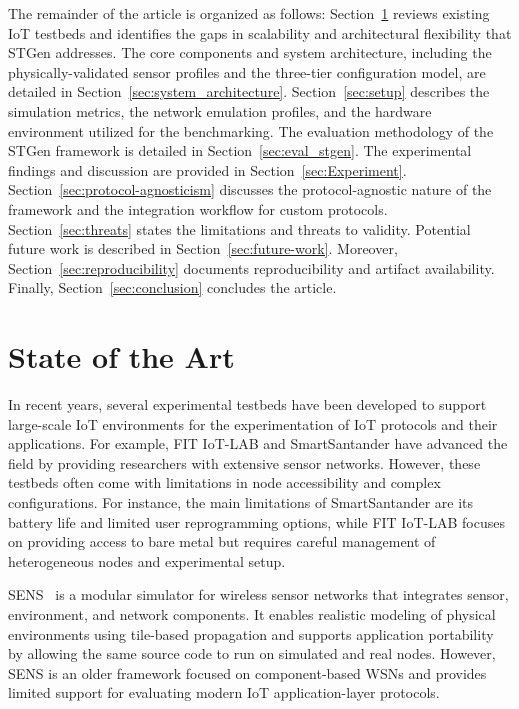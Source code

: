 \documentclass[jsan,article,submit,moreauthors,pdftex]{Definitions/mdpi}
\begin{document}
The remainder of the article is organized as follows: Section~\ref{sec:related_work} reviews existing {IoT} testbeds and identifies the gaps in scalability and architectural flexibility that STGen addresses. The core components and system architecture, including the physically-validated sensor profiles and the three-tier configuration model, are detailed in Section~\ref{sec:system_architecture}. Section~\ref{sec:setup} describes the simulation metrics, the network emulation profiles, and the hardware environment utilized for the benchmarking.  The evaluation methodology of the STGen framework is detailed in Section~\ref{sec:eval_stgen}. The experimental findings and discussion are provided in Section~\ref{sec:Experiment}. Section~\ref{sec:protocol-agnosticism} discusses the protocol-agnostic nature of the framework and the integration workflow for custom protocols. Section~\ref{sec:threats} states the limitations and threats to validity. Potential future work is described in Section~\ref{sec:future-work}. Moreover,  Section~\ref{sec:reproducibility} documents reproducibility and artifact availability. Finally, Section~\ref{sec:conclusion} concludes the article.

\section{State of the Art}
\label{sec:related_work}

In recent years, several experimental testbeds have been developed to support large-scale {IoT} environments for the experimentation of {IoT} protocols and their applications. For example, FIT IoT-LAB \cite{adjih2015fit} and SmartSantander \cite{sanchez2014smartsantander} have advanced the field by providing researchers with extensive sensor networks. However, these testbeds often come with limitations in node accessibility and complex configurations. For instance, the main limitations of SmartSantander are its battery life and limited user reprogramming options, while FIT IoT-LAB focuses on providing access to bare metal but requires careful management of heterogeneous nodes and experimental setup.

SENS~\cite{sundresh2004sens} is a modular simulator for wireless sensor networks that integrates sensor, environment, and network components. It enables realistic modeling of physical environments using tile-based propagation and supports application portability by allowing the same source code to run on simulated and real nodes. However, SENS is an older framework focused on component-based WSNs and provides limited support for evaluating modern {IoT} application-layer protocols.
\end{document}
